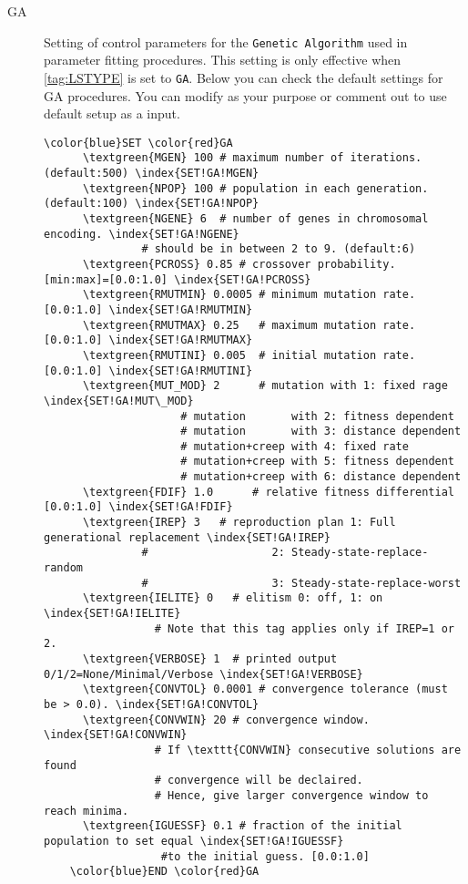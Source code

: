 \documentclass[a4paper,12pt]{scrartcl}
\makeatletter
\def\namedlabel#1#2{\begingroup
    #2%
    \def\@currentlabel{#2}%
    \phantomsection\label{#1}\endgroup
}
\newcommand{\textgreen}[1]{\textcolor{green!50!black}{\texttt{#1}}}
\makeatother
\begin{document}
\begin{description}
	\item[\namedlabel{tag:SET_GA}{GA}] 
		Setting of control parameters for the \texttt{Genetic Algorithm} used in parameter fitting procedures. This setting is only effective when \ref{tag:LSTYPE} is set to \texttt{GA}. Below you can check the default settings for GA procedures. You can modify as your purpose or comment out to use default setup as a input.
 
 \begin{Verbatim}[commandchars=\\\{\},gobble=4, frame=single, framesep=2mm, 
    label= GA default setup example,
    labelposition=bottomline]
    \color{blue}SET \color{red}GA
      \textgreen{MGEN} 100 # maximum number of iterations. (default:500) \index{SET!GA!MGEN}
      \textgreen{NPOP} 100 # population in each generation. (default:100) \index{SET!GA!NPOP}
      \textgreen{NGENE} 6  # number of genes in chromosomal encoding. \index{SET!GA!NGENE}
               # should be in between 2 to 9. (default:6)
      \textgreen{PCROSS} 0.85 # crossover probability. [min:max]=[0.0:1.0] \index{SET!GA!PCROSS}
      \textgreen{RMUTMIN} 0.0005 # minimum mutation rate. [0.0:1.0] \index{SET!GA!RMUTMIN}
      \textgreen{RMUTMAX} 0.25   # maximum mutation rate. [0.0:1.0] \index{SET!GA!RMUTMAX}
      \textgreen{RMUTINI} 0.005  # initial mutation rate. [0.0:1.0] \index{SET!GA!RMUTINI}
      \textgreen{MUT_MOD} 2      # mutation with 1: fixed rage \index{SET!GA!MUT\_MOD}
                     # mutation       with 2: fitness dependent
                     # mutation       with 3: distance dependent
                     # mutation+creep with 4: fixed rate
                     # mutation+creep with 5: fitness dependent
                     # mutation+creep with 6: distance dependent
      \textgreen{FDIF} 1.0      # relative fitness differential [0.0:1.0] \index{SET!GA!FDIF}
      \textgreen{IREP} 3   # reproduction plan 1: Full generational replacement \index{SET!GA!IREP}
               #                   2: Steady-state-replace-random
               #                   3: Steady-state-replace-worst
      \textgreen{IELITE} 0   # elitism 0: off, 1: on  \index{SET!GA!IELITE}
                 # Note that this tag applies only if IREP=1 or 2.
      \textgreen{VERBOSE} 1  # printed output 0/1/2=None/Minimal/Verbose \index{SET!GA!VERBOSE}
      \textgreen{CONVTOL} 0.0001 # convergence tolerance (must be > 0.0). \index{SET!GA!CONVTOL}
      \textgreen{CONVWIN} 20 # convergence window.  \index{SET!GA!CONVWIN}
                 # If \texttt{CONVWIN} consecutive solutions are found 
                 # convergence will be declaired. 
                 # Hence, give larger convergence window to reach minima.
      \textgreen{IGUESSF} 0.1 # fraction of the initial population to set equal \index{SET!GA!IGUESSF}
                  #to the initial guess. [0.0:1.0]
    \color{blue}END \color{red}GA
 \end{Verbatim}
	

\end{description}
\end{document}
